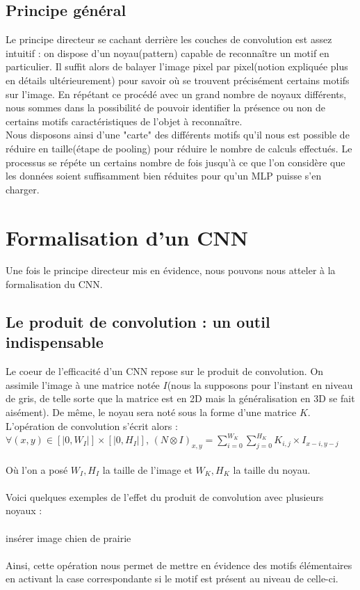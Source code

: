 \subsection{Principe général}
Le principe directeur se cachant derrière les couches de convolution est assez intuitif : on dispose d'un noyau(pattern) capable de reconnaître un motif en particulier. Il suffit alors de balayer l'image pixel par pixel(notion expliquée plus en détails ultérieurement) pour savoir où se trouvent précisément certains motifs sur l'image. En répétant ce procédé avec un grand nombre de noyaux différents, nous sommes dans la possibilité de pouvoir identifier la présence ou non de certains motifs caractéristiques de l'objet à reconnaître. \\
Nous disposons ainsi d'une "carte" des différents motifs qu'il nous est possible de réduire en taille(étape de pooling) pour réduire le nombre de calculs effectués. 
Le processus se répéte un certains nombre de fois jusqu'à ce que l'on considère que les données soient suffisamment bien réduites pour qu'un MLP puisse s'en charger. 

\section{Formalisation d'un CNN}

Une fois le principe directeur mis en évidence, nous pouvons nous atteler à la formalisation du CNN.

\subsection{Le produit de convolution : un outil indispensable}

Le coeur de l'efficacité d'un CNN repose sur le produit de convolution. On assimile l'image à une matrice notée $I$(nous la supposons pour l'instant en niveau de gris, de telle sorte que la matrice est en 2D mais la généralisation en 3D se fait aisément). De même, le noyau sera noté sous la forme d'une matrice $K$.
L'opération de convolution s'écrit alors : \\

$\forall (x,y) \in [|0,W_I|] \times [|0,H_I|]$,  $(N \otimes I)_{x,y} = \sum_{i=0}^{W_K} \sum_{j=0}^{H_K} K_{i,j} \times I_{x-i,y-j}$ \\
\\
Où l'on a posé $W_I,H_I$ la taille de l'image et $W_K,H_K$ la taille du noyau. \\
\\
Voici quelques exemples de l'effet du produit de convolution avec plusieurs noyaux :\\
\\
{insérer image chien de prairie}\\
\\
Ainsi, cette opération nous permet de mettre en évidence des motifs élémentaires en activant la case correspondante si le motif est présent au niveau de celle-ci.

